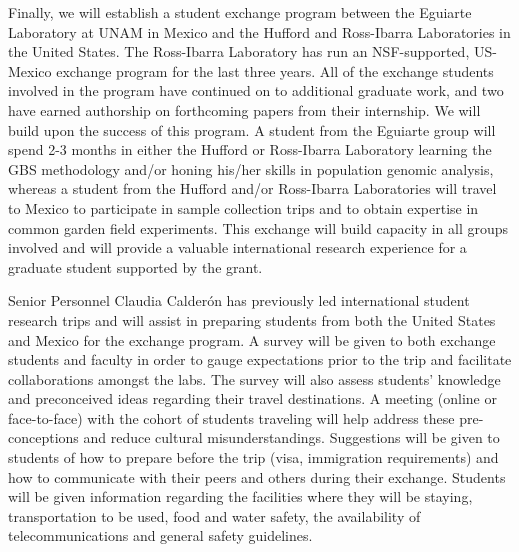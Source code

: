 Finally, we will establish a student exchange program between the Eguiarte Laboratory at UNAM in Mexico and the Hufford and Ross-Ibarra Laboratories in the United States. The Ross-Ibarra Laboratory has run an NSF-supported, US-Mexico exchange program for the last three years.  All of the exchange students involved in the program have continued on to additional graduate work, and two have earned authorship on forthcoming papers from their internship.  We will build upon the success of this program.  A student from the Eguiarte group will spend 2-3 months in either the Hufford or Ross-Ibarra Laboratory learning the GBS methodology and/or honing his/her skills in population genomic analysis, whereas a student from the Hufford and/or Ross-Ibarra Laboratories will travel to Mexico to participate in sample collection trips and to obtain expertise in common garden field experiments. This exchange will build capacity in all groups involved and will provide a valuable international research experience for a graduate student supported by the grant.  

Senior Personnel Claudia Calder\'{o}n has previously led international student research trips and will assist in preparing students from both the United States and Mexico for the exchange program. A survey will be given to both exchange students and faculty in order to gauge expectations prior to the trip and facilitate collaborations amongst the labs.  The survey will also assess students' knowledge and preconceived ideas  regarding their travel destinations.  A meeting (online or face-to-face) with the cohort of students traveling will help address these pre-conceptions and reduce cultural misunderstandings.  Suggestions will be given to students of how to prepare before the trip (visa, immigration requirements) and how to communicate with their peers and others during their exchange.  Students will be given information regarding the facilities where they will be staying, transportation to be used, food and water safety, the availability of telecommunications and general safety guidelines.



